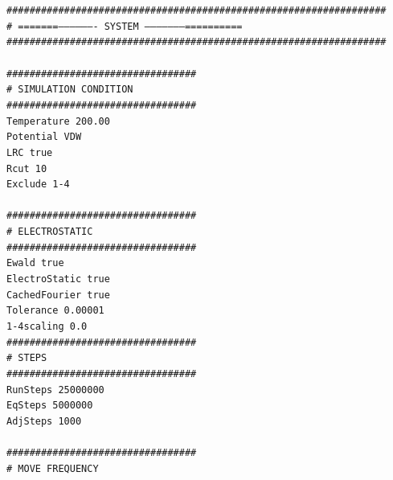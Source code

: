 \texttt{\#\#\#\#\#\#\#\#\#\#\#\#\#\#\#\#\#\#\#\#\#\#\#\#\#\#\#\#\#\#\#\#\#\#\#\#\#\#\#\#\#\#\#\#\#\#\#\#\#\#\#\#\#\#\#\#\#\#\#\#\#\#\#\#\#\#}\\
\texttt{\#  =======------------------- SYSTEM --------------------==========}\\
\texttt{\#\#\#\#\#\#\#\#\#\#\#\#\#\#\#\#\#\#\#\#\#\#\#\#\#\#\#\#\#\#\#\#\#\#\#\#\#\#\#\#\#\#\#\#\#\#\#\#\#\#\#\#\#\#\#\#\#\#\#\#\#\#\#\#\#\#}\\
\texttt{}\\
\texttt{\#\#\#\#\#\#\#\#\#\#\#\#\#\#\#\#\#\#\#\#\#\#\#\#\#\#\#\#\#\#\#\#\#}\\
\texttt{\# SIMULATION CONDITION}\\
\texttt{\#\#\#\#\#\#\#\#\#\#\#\#\#\#\#\#\#\#\#\#\#\#\#\#\#\#\#\#\#\#\#\#\#}\\
\texttt{Temperature     200.00}\\
\texttt{Potential 		VDW}\\
\texttt{LRC		true}\\
\texttt{Rcut		10}\\
\texttt{Exclude 		1-4}\\
\texttt{}\\
\texttt{\#\#\#\#\#\#\#\#\#\#\#\#\#\#\#\#\#\#\#\#\#\#\#\#\#\#\#\#\#\#\#\#\#}\\
\texttt{\# ELECTROSTATIC}\\
\texttt{\#\#\#\#\#\#\#\#\#\#\#\#\#\#\#\#\#\#\#\#\#\#\#\#\#\#\#\#\#\#\#\#\#}\\
\texttt{Ewald			true}\\
\texttt{ElectroStatic		true}\\
\texttt{CachedFourier	true}\\
\texttt{Tolerance		0.00001}\\
\texttt{1-4scaling		0.0}\\
\texttt{\#\#\#\#\#\#\#\#\#\#\#\#\#\#\#\#\#\#\#\#\#\#\#\#\#\#\#\#\#\#\#\#\#}\\
\texttt{\# STEPS }\\
\texttt{\#\#\#\#\#\#\#\#\#\#\#\#\#\#\#\#\#\#\#\#\#\#\#\#\#\#\#\#\#\#\#\#\#}\\
\texttt{RunSteps           25000000}\\
\texttt{EqSteps		   5000000}\\
\texttt{AdjSteps		   1000}\\
\texttt{}\\
\texttt{\#\#\#\#\#\#\#\#\#\#\#\#\#\#\#\#\#\#\#\#\#\#\#\#\#\#\#\#\#\#\#\#\#}\\
\texttt{\# MOVE FREQUENCY}\\
